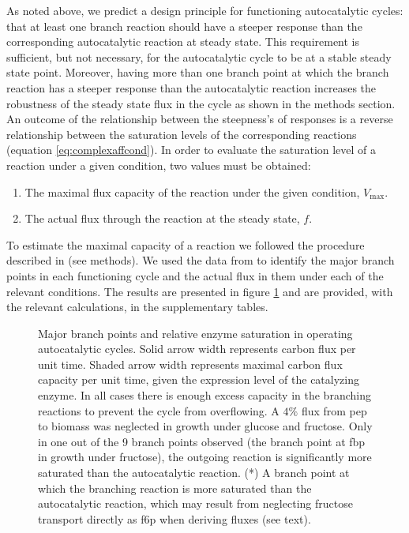     As noted above, we predict a design principle for functioning autocatalytic cycles: that at least one branch reaction should have a steeper response than the corresponding autocatalytic reaction at steady state.
    This requirement is sufficient, but not necessary, for the autocatalytic cycle to be at a stable steady state point.
    Moreover, having more than one branch point at which the branch reaction has a steeper response than the autocatalytic reaction increases the robustness of the steady state flux in the cycle as shown in the methods section.
    An outcome of the relationship between the steepness's of responses is a reverse relationship between the saturation levels of the corresponding reactions (equation \ref{eq:complexaffcond}).
    In order to evaluate the saturation level of a reaction under a given condition, two values must be obtained:
    \begin{enumerate}
      \item The maximal flux capacity of the reaction under the given condition, $V_{\max}$.
        \item The actual flux through the reaction at the steady state, $f$.
    \end{enumerate}

    To estimate the maximal capacity of a reaction we followed the procedure described in \cite{Davidi2016-ga} (see methods).
    We used the data from \cite{Gerosa2015-oq} to identify the major branch points in each functioning cycle and the actual flux in them under each of the relevant conditions.
    The results are presented in figure \ref{fig:branch} and are provided, with the relevant calculations, in the supplementary tables.

\begin{figure}[!htb]
\centering
\resizebox{1\linewidth}{!}{
    
}
\caption{
  Major branch points and relative enzyme saturation in operating autocatalytic cycles.
  Solid arrow width represents carbon flux per unit time.
  Shaded arrow width represents maximal carbon flux capacity per unit time, given the expression level of the catalyzing enzyme.
  In all cases there is enough excess capacity in the branching reactions to prevent the cycle from overflowing.
  A $4\%$ flux from pep to biomass was neglected in growth under glucose and fructose.
  Only in one out of the 9 branch points observed (the branch point at fbp in growth under fructose), the outgoing reaction is significantly more saturated than the autocatalytic reaction.
  (*) A branch point at which the branching reaction is more saturated than the autocatalytic reaction, which may result from neglecting fructose transport directly as f6p when deriving fluxes (see text).
}
    \label{fig:branch}
\end{figure}

